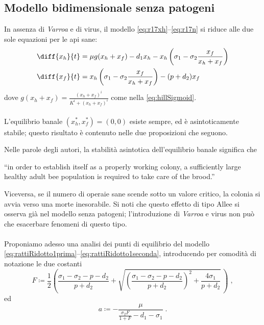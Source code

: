 \subsection{Modello bidimensionale senza patogeni}
In assenza di \emph{Varroa} e di virus, il modello \eqref{eq:r17xh}--\eqref{eq:r17n} si riduce alle due sole equazioni per le api sane:
\begin{align}
    \diff{x_h}{t} &= \mu g( x_h + x_f ) - d_1 x_h - x_h \left( \sigma_1 - \sigma_2 \frac{x_f}{x_h + x_f} \right)
    \label{eq:rattiRidotto1prima}
    \\
    \diff{x_f}{t} &= x_h \left( \sigma_1 - \sigma_2 \frac{x_f}{x_h + x_f} \right) - (p + d_2) x_f
    \label{eq:rattiRidotto1seconda}
\end{align}
dove $g(x_h + x_f) = \frac{ (x_h+x_f)^i }{ K^i + (x_h+x_f)^i }$ come nella \eqref{eq:hillSigmoid}.

\paragraph{}
L'equilibrio banale $(x_h^*, x_f^*) = (0,0)$ esiste sempre, ed è asintoticamente stabile; questo risultato è contenuto nelle due proposizioni che seguono.

Nelle parole degli autori, la stabilità asintotica dell'equilibrio banale significa che
\begin{displayquote}
``\omissis in order to establish itself as a properly working colony, a sufficiently large healthy adult bee population is required to take care of the brood.''
\end{displayquote}

Viceversa, se il numero di operaie sane scende sotto un valore critico, la colonia si avvia verso una morte inesorabile.
Si noti che questo effetto di tipo Allee si osserva già nel modello senza patogeni; l'introduzione di \emph{Varroa} e virus non può che esacerbare fenomeni di questo tipo.

\paragraph{}
Proponiamo adesso una analisi dei punti di equilibrio del modello \eqref{eq:rattiRidotto1prima}--\eqref{eq:rattiRidotto1seconda}, introducendo per comodità di notazione le due costanti
\begin{equation}
    F \coloneq \frac{1}{2} \left( \frac{ \sigma_1 - \sigma_2 - p - d_2 }{p+d_2} +
    \sqrt{ {\left( \frac{ \sigma_1 - \sigma_2 - p - d_2 }{p+d_2} \right)}^2 + \frac{4 \sigma_1}{p+d_2} } \, \right)
    \; ,
    \label{eq:rattiFconst}
\end{equation}
ed
\begin{equation}
 a \coloneq - \frac{ \mu }{ \frac{\sigma_2 F}{1+F} - d_1 - \sigma_1 } \; .
 \label{eq:rattiaconst}
\end{equation}

